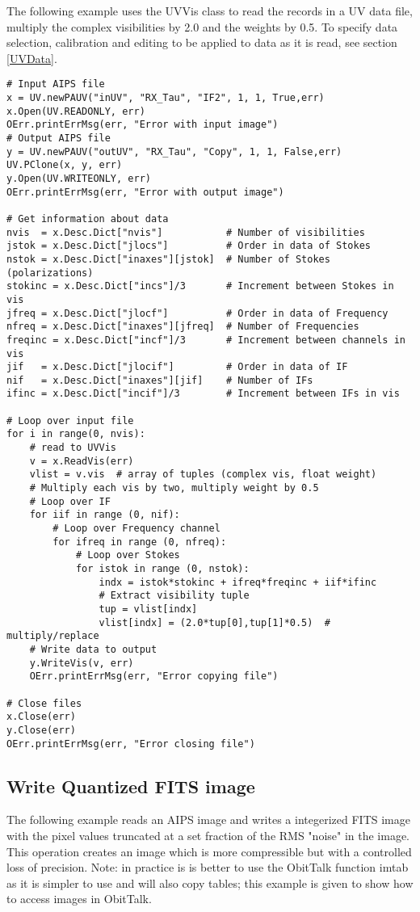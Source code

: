 \documentclass[11pt]{report}
\begin{document}
   The following example uses the UVVis class to read the records in a
UV data file, multiply the complex visibilities by 2.0 and the weights
by 0.5.
To specify data selection, calibration and editing to be applied to
data as it is read, see section \ref{UVData}.
\begin{verbatim}
# Input AIPS file
x = UV.newPAUV("inUV", "RX_Tau", "IF2", 1, 1, True,err)
x.Open(UV.READONLY, err)
OErr.printErrMsg(err, "Error with input image")
# Output AIPS file
y = UV.newPAUV("outUV", "RX_Tau", "Copy", 1, 1, False,err)
UV.PClone(x, y, err)
y.Open(UV.WRITEONLY, err)
OErr.printErrMsg(err, "Error with output image")

# Get information about data
nvis  = x.Desc.Dict["nvis"]           # Number of visibilities
jstok = x.Desc.Dict["jlocs"]          # Order in data of Stokes
nstok = x.Desc.Dict["inaxes"][jstok]  # Number of Stokes (polarizations)
stokinc = x.Desc.Dict["incs"]/3       # Increment between Stokes in vis
jfreq = x.Desc.Dict["jlocf"]          # Order in data of Frequency
nfreq = x.Desc.Dict["inaxes"][jfreq]  # Number of Frequencies
freqinc = x.Desc.Dict["incf"]/3       # Increment between channels in vis
jif   = x.Desc.Dict["jlocif"]         # Order in data of IF
nif   = x.Desc.Dict["inaxes"][jif]    # Number of IFs
ifinc = x.Desc.Dict["incif"]/3        # Increment between IFs in vis

# Loop over input file
for i in range(0, nvis):    
    # read to UVVis
    v = x.ReadVis(err)
    vlist = v.vis  # array of tuples (complex vis, float weight)
    # Multiply each vis by two, multiply weight by 0.5
    # Loop over IF
    for iif in range (0, nif):
        # Loop over Frequency channel
        for ifreq in range (0, nfreq):
            # Loop over Stokes
            for istok in range (0, nstok):
                indx = istok*stokinc + ifreq*freqinc + iif*ifinc
                # Extract visibility tuple
                tup = vlist[indx]
                vlist[indx] = (2.0*tup[0],tup[1]*0.5)  # multiply/replace
    # Write data to output
    y.WriteVis(v, err)
    OErr.printErrMsg(err, "Error copying file")

# Close files
x.Close(err)
y.Close(err)
OErr.printErrMsg(err, "Error closing file")
\end{verbatim}

\subsection{Write Quantized FITS image}
   The following example reads an AIPS image and writes a integerized FITS
image with the pixel values truncated at a set fraction of the RMS "noise"
in the image.  This operation creates an image which is more compressible
but with a controlled loss of precision.
Note: in practice is is better to use the ObitTalk function imtab as
it is simpler to use and will also copy tables; this example is given
to show how to access images in ObitTalk.
\end{document}
